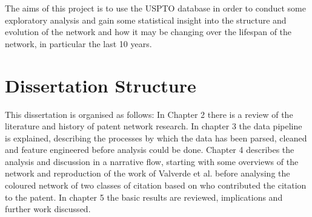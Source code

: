The aims of this project is to use the USPTO database in order to conduct some exploratory analysis and gain some statistical insight into the structure and evolution of the network and how it may be changing over the lifespan of the network, in particular the last 10 years. 

\section{Dissertation Structure}
This dissertation is organised as follows: In Chapter 2 there is a review of the literature and history of patent network research. In chapter 3 the data pipeline is explained, describing the processes by which the data has been parsed, cleaned and feature engineered before analysis could be done. Chapter 4 describes the analysis and discussion in a narrative flow, starting with some overviews of the network and reproduction of the work of Valverde et al. before analysing the coloured network of two classes of citation based on who contributed the citation to the patent. In chapter 5 the basic results are reviewed, implications and further work discussed. 
